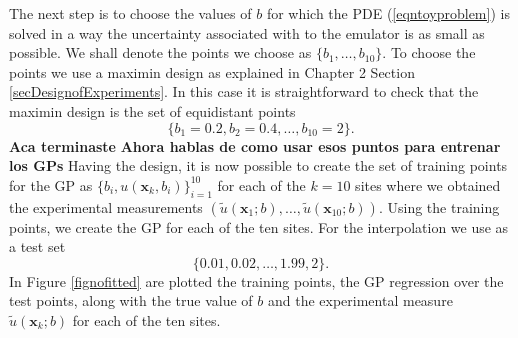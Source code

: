 \documentclass[12pt]{book}
\newcommand{\x}{\textbf{x}}
\begin{document}
The next step is to choose  the values of $b$  for which the  PDE (\ref{eqntoyproblem}) is solved in a 
way the uncertainty associated with to the emulator is as small as possible. 
We shall denote the points we choose as $\{b_{1},\dots,b_{10}\}$. To choose the points 
we use a maximin design as explained in Chapter 2 Section \ref{secDesignofExperiments}. In this case
it is straightforward to check that the maximin design is the set of equidistant points
\begin{equation*}
\{b_{1}=0.2,b_{2}=0.4,\ldots,b_{10}=2\}.
\end{equation*}
\textbf{Aca terminaste}
\textbf{Ahora hablas de como usar esos puntos para entrenar los GPs}
\newline 
Having the design, it is now possible to  create the set of training points for the GP as 
$\{b_{i},u(\x_{k},b_{i})\}_{i=1}^{10}$ for each of the 
$k=10$ sites where we obtained the experimental measurements $(\tilde{u}(\x_{1};b),\ldots,\tilde{u}(\x_{10};b))$.
 Using the training
points, we create the GP for each of the ten sites. For the interpolation we use as a test set
\begin{equation*}
\{0.01,0.02,\ldots,1.99,2\}.
\end{equation*} 
In Figure \ref{fignofitted} are plotted the training points, 
the GP regression over the test points, along with the true value of $b$
and the experimental measure $\tilde{u}(\x_{k};b)$ for each of the ten sites.



%
%
\end{document}
